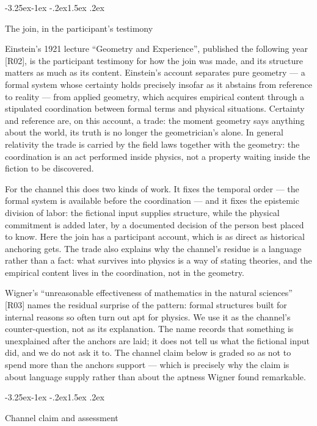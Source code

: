 \documentclass[11pt,a4paper]{article}
\makeatletter
\renewcommand\subsection{\@startsection{subsection}{2}{\z@}%
  {-3.25ex\@plus -1ex \@minus -.2ex}{1.5ex \@plus .2ex}%
  {\normalfont\large\bfseries\raggedright}}
\makeatother
\begin{document}
\subsection{The join, in the participant's testimony}

Einstein's 1921 lecture ``Geometry and Experience'', published the following year [R02], is the participant testimony for how the join was made, and its structure matters as much as its content. Einstein's account separates pure geometry — a formal system whose certainty holds precisely insofar as it abstains from reference to reality — from applied geometry, which acquires empirical content through a stipulated coordination between formal terms and physical situations. Certainty and reference are, on this account, a trade: the moment geometry says anything about the world, its truth is no longer the geometrician's alone. In general relativity the trade is carried by the field laws together with the geometry: the coordination is an act performed inside physics, not a property waiting inside the fiction to be discovered.

For the channel this does two kinds of work. It fixes the temporal order — the formal system is available before the coordination — and it fixes the epistemic division of labor: the fictional input supplies structure, while the physical commitment is added later, by a documented decision of the person best placed to know. Here the join has a participant account, which is as direct as historical anchoring gets. The trade also explains why the channel's residue is a language rather than a fact: what survives into physics is a way of stating theories, and the empirical content lives in the coordination, not in the geometry.

Wigner's ``unreasonable effectiveness of mathematics in the natural sciences'' [R03] names the residual surprise of the pattern: formal structures built for internal reasons so often turn out apt for physics. We use it as the channel's counter-question, not as its explanation. The name records that something is unexplained after the anchors are laid; it does not tell us what the fictional input did, and we do not ask it to. The channel claim below is graded so as not to spend more than the anchors support — which is precisely why the claim is about language supply rather than about the aptness Wigner found remarkable.

\subsection{Channel claim and assessment}
\end{document}
